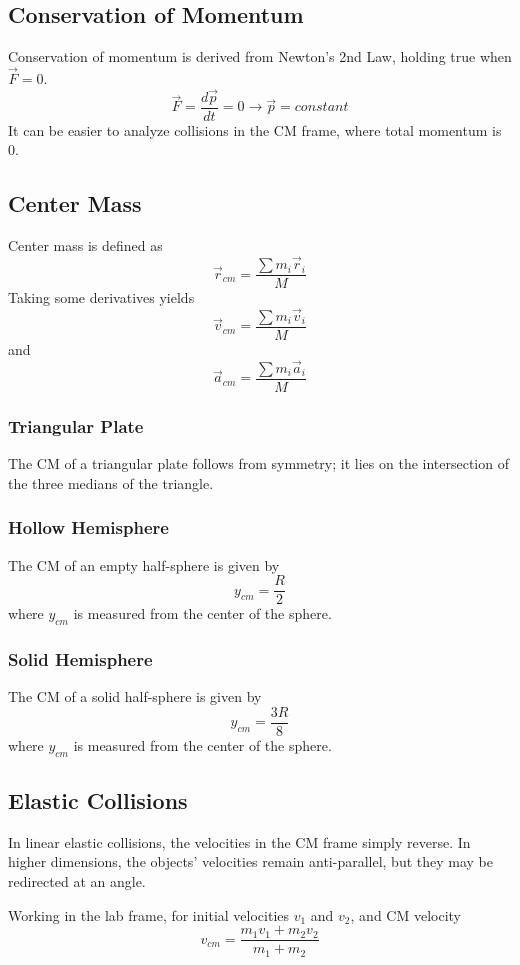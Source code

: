 \documentclass[../PhysicsFormulae.tex]{subfiles}
\begin{document}
\subsection{Conservation of Momentum}
Conservation of momentum is derived from Newton's 2nd Law, holding true when $\vec{F}=0$.
\[\vec{F} = \frac{d\vec{p}}{dt}=0 \rightarrow \vec{p}=constant\]
It can be easier to analyze collisions in the CM frame, where total momentum is 0. 

\subsection{Center Mass}
Center mass is defined as
\[\vec{r}_{cm} = \frac{\sum m_i \vec{r}_i}{M}\]
Taking some derivatives yields
\[\vec{v}_{cm} = \frac{\sum m_i \vec{v}_i}{M}\]
and
\[\vec{a}_{cm} = \frac{\sum m_i \vec{a}_i}{M}\]

\subsubsection{Triangular Plate}
The CM of a triangular plate follows from symmetry; it lies on the intersection of the three medians of the triangle.

\subsubsection{Hollow Hemisphere}
The CM of an empty half-sphere is given by
\[y_{cm} = \frac{R}{2}\]
where $y_{cm}$ is measured from the center of the sphere.

\subsubsection{Solid Hemisphere}
The CM of a solid half-sphere is given by 
\[y_{cm} = \frac{3R}{8}\]
where $y_{cm}$ is measured from the center of the sphere.

\subsection{Elastic Collisions}
In linear elastic collisions, the velocities in the CM frame simply reverse. In higher dimensions, the objects' velocities remain anti-parallel, but they may be redirected at an angle.\bigskip

Working in the lab frame, for initial velocities $v_1$ and $v_2$, and CM velocity 
\[v_{cm}=\frac{m_1v_1 + m_2v_2}{m_1 + m_2}\]
\end{document}
